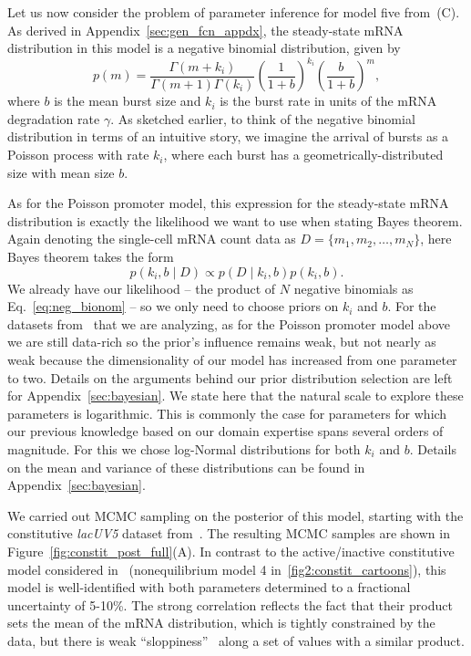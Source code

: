 Let us now consider the problem of parameter inference for model five
from~(C). As derived in
Appendix~\ref{sec:gen_fcn_appdx}, the steady-state mRNA distribution in this
model is a negative binomial distribution, given by
\begin{equation}
p(m) = \frac{\Gamma(m+k_i)}{\Gamma(m+1)\Gamma(k_i)}
        \left(\frac{1}{1+b}\right)^{k_i}
        \left(\frac{b}{1+b}\right)^m,
\label{eq:neg_bionom}
\end{equation}
where $b$ is the mean burst size and $k_i$ is the burst rate in units of the
mRNA degradation rate $\gamma$. As sketched earlier, to think of the negative
binomial distribution in terms of an intuitive story, we imagine the arrival of
bursts as a Poisson process with rate $k_i$, where each burst has a 
geometrically-distributed size with mean size $b$.

As for the Poisson promoter model, this expression for the steady-state mRNA
distribution is exactly the likelihood we want to use when stating Bayes
theorem. Again denoting the single-cell mRNA count data as $D=\{m_1, m_2,\dots,
m_N\}$, here Bayes theorem takes the form
\begin{equation}
p(k_i, b \mid D) \propto p(D\mid k_i,b)p(k_i, b).
\end{equation}
We already have our likelihood -- the product of $N$ negative binomials as
Eq.~\ref{eq:neg_bionom} -- so we only need to choose priors on $k_i$ and $b$.
For the datasets from~\cite{Jones2014} that we are analyzing, as for the Poisson
promoter model above we are still data-rich so the prior's influence remains
weak, but not nearly as weak because the dimensionality of our model has
increased from one parameter to two. Details on the arguments behind our prior
distribution selection are left for Appendix~\ref{sec:bayesian}. We state here
that the natural scale to explore these parameters is logarithmic. This is
commonly the case for parameters for which our previous knowledge based on our
domain expertise spans several orders of magnitude. For this we chose log-Normal
distributions for both $k_i$ and $b$. Details on the mean and variance of these
distributions can be found in Appendix~\ref{sec:bayesian}.

We carried out MCMC sampling on the posterior of this model, starting with the
constitutive \textit{lacUV5} dataset from~\cite{Jones2014}. The resulting MCMC
samples are shown in Figure~\ref{fig:constit_post_full}(A). In contrast to the
active/inactive constitutive model considered in~\cite{Razo-Mejia2020}
(nonequilibrium model 4 in~\ref{fig2:constit_cartoons}), this model is
well-identified with both parameters determined to a fractional uncertainty of
5-10\%. The strong correlation reflects the fact that their product sets the
mean of the mRNA distribution, which is tightly constrained by the data, but
there is weak ``sloppiness''~\cite{Transtrum2015} along a set of values with a
similar product.

